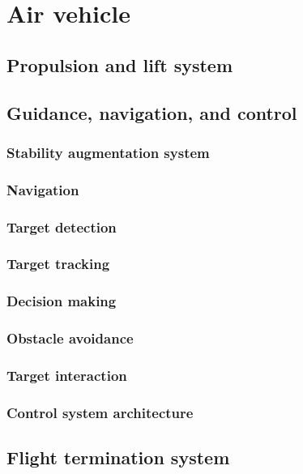 \section*{Air vehicle} \label{sec:vehicle}

\subsection*{Propulsion and lift system} \label{subsec:vehicle-proplift}




\subsection*{Guidance, navigation, and control} \label{subsec:vehicle-gnc}

\subsubsection*{Stability augmentation system}



\subsubsection*{Navigation}



\subsubsection*{Target detection}



\subsubsection*{Target tracking}



\subsubsection*{Decision making}



\subsubsection*{Obstacle avoidance}



\subsubsection*{Target interaction}



\subsubsection*{Control system architecture}



\subsection*{Flight termination system} \label{subsec:vehicle-killswitch}

